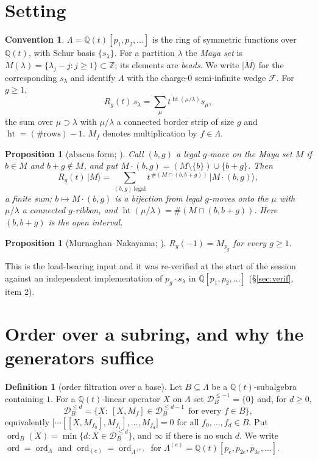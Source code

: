 \documentclass[11pt]{article}
\newtheorem{proposition}[theorem]{Proposition}
\theoremstyle{definition}
\newtheorem{convention}[theorem]{Convention}
\newtheorem{definition}[theorem]{Definition}
\DeclareMathOperator{\ord}{ord}
\newcommand{\hgt}{\operatorname{ht}}   %
\newcommand{\Z}{\mathbb{Z}}
\newcommand{\Q}{\mathbb{Q}}
\newcommand{\Lam}{\Lambda}
\newcommand{\F}{\mathcal{F}}
\newcommand{\D}{\mathcal{D}}
\begin{document}
\section{Setting}

\begin{convention}\label{conv:main}
$\Lam=\Q(t)[p_1,p_2,\dots]$ is the ring of symmetric functions over $\Q(t)$, with Schur
basis $\{s_\lambda\}$.  For a partition $\lambda$ the \emph{Maya set} is
$M(\lambda)=\{\lambda_j-j:j\ge1\}\subset\Z$; its elements are \emph{beads}.  We write
$|M\rangle$ for the corresponding $s_\lambda$ and identify $\Lam$ with the charge-$0$
semi-infinite wedge $\F$.  For $g\ge1$,
\[
  R_g(t)\,s_\lambda=\sum_{\mu}t^{\hgt(\mu/\lambda)}s_\mu,
\]
the sum over $\mu\supset\lambda$ with $\mu/\lambda$ a connected border strip of size $g$
and $\hgt=(\#\text{rows})-1$.  $M_f$ denotes multiplication by $f\in\Lam$.
\end{convention}

\begin{proposition}[abacus form; {\cite[Prop.~1.2]{Clio0907}}]\label{prop:abacus}
Call $(b,g)$ a \emph{legal $g$-move} on the Maya set $M$ if $b\in M$ and $b+g\notin M$,
and put $M\cdot(b,g)=(M\setminus\{b\})\cup\{b+g\}$.  Then
\[
  R_g(t)\,|M\rangle=\sum_{(b,g)\ \mathrm{legal}}t^{\,\#(M\cap(b,b+g))}\,\bigl|M\cdot(b,g)\bigr\rangle ,
\]
a finite sum; $b\mapsto M\cdot(b,g)$ is a bijection from legal $g$-moves onto the $\mu$
with $\mu/\lambda$ a connected $g$-ribbon, and $\hgt(\mu/\lambda)=\#(M\cap(b,b+g))$.  Here
$(b,b+g)$ is the \emph{open} interval.
\end{proposition}

\begin{proposition}[{Murnaghan--Nakayama; \cite[Q75]{Clio0903}}]\label{prop:mn}
$R_g(-1)=M_{p_g}$ for every $g\ge1$.
\end{proposition}

\noindent
This is the load-bearing input and it was re-verified at the start of the session against
an independent implementation of $p_g\cdot s_\lambda$ in $\Q[p_1,p_2,\dots]$
(\S\ref{sec:verif}, item 2).

\section{Order over a subring, and why the generators suffice}

\begin{definition}[order filtration over a base]\label{def:ord}
Let $B\subseteq\Lam$ be a $\Q(t)$-subalgebra containing $1$.  For a $\Q(t)$-linear
operator $X$ on $\Lam$ set $\D^{\le-1}_B=\{0\}$ and, for $d\ge0$,
\[
  \D^{\le d}_B=\bigl\{X:\ [X,M_f]\in\D^{\le d-1}_B\ \ \text{for every }f\in B\bigr\},
\]
equivalently $\bigl[\cdots[[X,M_{f_0}],M_{f_1}],\dots,M_{f_d}\bigr]=0$ for all
$f_0,\dots,f_d\in B$.  Put $\ord_B(X)=\min\{d:X\in\D^{\le d}_B\}$, and $\infty$ if there is
no such $d$.  We write $\ord=\ord_\Lam$ and $\ord_{(e)}=\ord_{\Lam^{(e)}}$ for
$\Lam^{(e)}=\Q(t)[p_e,p_{2e},p_{3e},\dots]$.
\end{definition}
\end{document}
